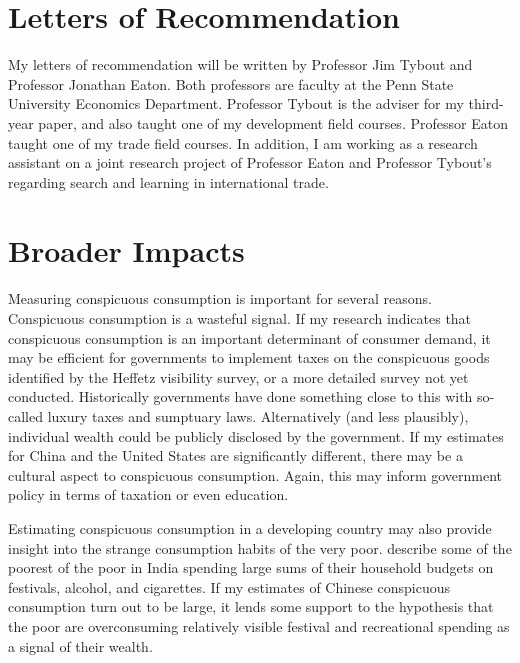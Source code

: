 \documentclass[a4paper,10pt]{article}
\begin{document}
\section{Letters of Recommendation}
My letters of recommendation will be written by Professor Jim Tybout and Professor Jonathan Eaton. Both professors are faculty at the Penn State University Economics Department.  Professor Tybout is the adviser for my third-year paper, and also taught one of my development field courses.  Professor Eaton taught one of my trade field courses.  In addition, I am working as a research assistant on a joint research project of Professor Eaton and Professor Tybout's regarding search and learning in international trade.

\section{Broader Impacts}
Measuring conspicuous consumption is important for several reasons.  Conspicuous consumption is a wasteful signal.  If my research indicates that conspicuous consumption is an important determinant of consumer demand, it may be efficient for governments to implement taxes on the conspicuous goods identified by the Heffetz visibility survey, or a more detailed survey not yet conducted.  Historically governments have done something close to this with so-called luxury taxes and sumptuary laws.  Alternatively (and less plausibly), individual wealth could be publicly disclosed by the government.  If my estimates for China and the United States are significantly different, there may be a cultural aspect to conspicuous consumption.  Again, this may inform government policy in terms of taxation or even education.

Estimating conspicuous consumption in a developing country may also provide insight into the strange consumption habits of the very poor.  \citet{BanerjeeDuflo2007} describe some of the poorest of the poor in India spending large sums of their household budgets on festivals, alcohol, and cigarettes.  If my estimates of Chinese conspicuous consumption turn out to be large, it lends some support to the hypothesis that the poor are overconsuming relatively visible festival and recreational spending as a signal of their wealth.

      




\appendix
\end{document}
